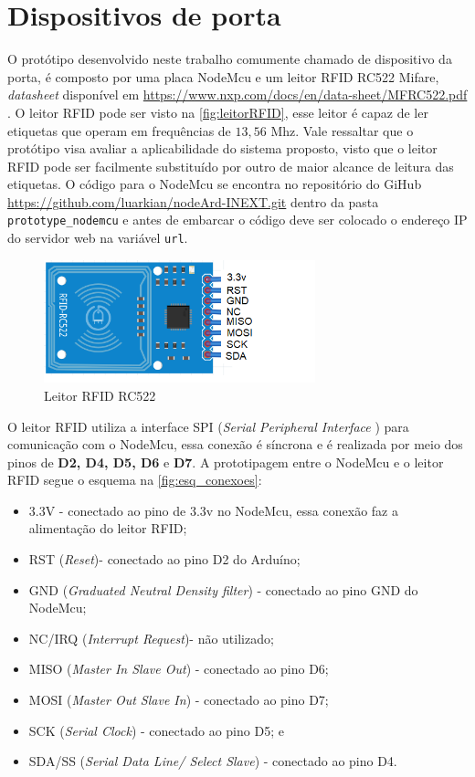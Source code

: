 \section{Dispositivos de porta}

O protótipo desenvolvido neste trabalho comumente chamado de dispositivo da porta, é composto por uma placa NodeMcu e um leitor RFID RC522 Mifare, \textit{datasheet} disponível em \url{https://www.nxp.com/docs/en/data-sheet/MFRC522.pdf} . O leitor RFID pode ser visto na \autoref{fig:leitorRFID}, esse leitor é capaz de ler etiquetas que operam em
frequências de $13,56$ Mhz. 
% 
Vale ressaltar que o protótipo visa avaliar a aplicabilidade do sistema proposto, visto que o leitor RFID pode ser facilmente substituído por outro de maior alcance de leitura das etiquetas.
% 
O código para o NodeMcu se encontra no repositório do GiHub \url{https://github.com/luarkian/nodeArd-INEXT.git} dentro da pasta \texttt{prototype\_nodemcu} e antes de embarcar o código deve ser colocado o endereço IP do servidor web na variável \texttt{url}.
\begin{figure}[H]
              \caption{\label{fig:leitorRFID}{Leitor RFID RC522}}
              \centering
              \includegraphics[width=0.7\textwidth]{Figuras/rfid_rc522.PNG}
\end{figure}

\par
O leitor RFID utiliza a interface SPI (\textit{Serial Peripheral Interface} ) para comunicação com o NodeMcu,
essa conexão é síncrona e é realizada por meio dos pinos de \textbf{D2, D4, D5, D6} e \textbf{D7}. A prototipagem entre o NodeMcu e o leitor RFID
segue o esquema na \autoref{fig:esq_conexoes}:

\begin{itemize}
    \item 3.3V - conectado ao pino de 3.3v no NodeMcu, essa conexão faz a alimentação do leitor RFID;
    \item RST (\textit{Reset})- conectado ao pino D2 do Arduíno;
    \item GND (\textit{Graduated Neutral Density filter}) - conectado ao pino GND do NodeMcu;
    \item NC/IRQ (\textit{Interrupt Request})- não utilizado;
    \item MISO (\textit{Master In Slave Out}) - conectado ao pino D6;
    \item MOSI  (\textit{Master Out Slave In}) - conectado ao pino D7;
    \item SCK  (\textit{Serial Clock}) - conectado ao pino D5; e
    \item SDA/SS (\textit{Serial Data Line/ Select Slave}) - conectado ao pino D4.
\end{itemize}

